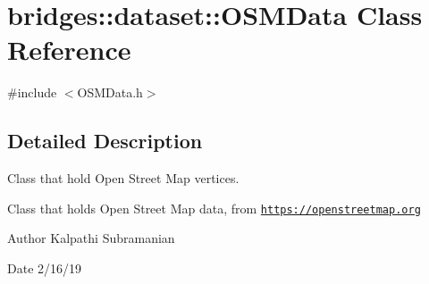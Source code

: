 \hypertarget{classbridges_1_1dataset_1_1_o_s_m_data}{}\section{bridges\+:\+:dataset\+:\+:O\+S\+M\+Data Class Reference}
\label{classbridges_1_1dataset_1_1_o_s_m_data}


{\ttfamily \#include $<$O\+S\+M\+Data.\+h$>$}



\subsection{Detailed Description}
Class that hold Open Street Map vertices. 

Class that holds Open Street Map data, from \href{https://openstreetmap.org}{\tt https\+://openstreetmap.\+org}

\begin{DoxyAuthor}{Author}
Kalpathi Subramanian 
\end{DoxyAuthor}
\begin{DoxyDate}{Date}
2/16/19 
\end{DoxyDate}
